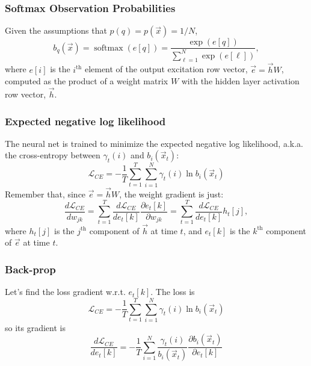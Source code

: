 \documentclass{beamer}
\DeclareMathOperator*{\softmax}{softmax}
\begin{document}
\begin{frame}
  \frametitle{Softmax Observation Probabilities}

  Given the assumptions that $p(q)=p(\vec{x})=1/N$, 
  \begin{displaymath}
    b_q(\vec{x}) = \softmax(e[q]) = \frac{\exp(e[q])}{\sum_{\ell=1}^N \exp(e[\ell])},
  \end{displaymath}
  where $e[i]$ is the $i^{\textrm{th}}$ element of the output
  excitation row vector, $\vec{e}=\vec{h}W$, computed as the product of a
  weight matrix $W$ with the hidden layer activation row vector, $\vec{h}$.
\end{frame}

\begin{frame}
  \frametitle{Expected negative log likelihood}

  The neural net is trained to minimize the expected negative log
  likelihood, a.k.a. the cross-entropy between $\gamma_t(i)$ and
  $b_i(\vec{x}_t)$:
  \begin{displaymath}
    {\mathcal L}_{CE} = -\frac{1}{T}\sum_{t=1}^T\sum_{i=1}^N\gamma_t(i)\ln b_i(\vec{x}_t)
  \end{displaymath}
  Remember that, since $\vec{e}=\vec{h}W$, the weight gradient is just:
  \begin{displaymath}
    \frac{d{\mathcal L}_{CE}}{dw_{jk}} =
    \sum_{t=1}^T \frac{d{\mathcal L}_{CE}}{de_t[k]}\frac{\partial e_t[k]}{\partial w_{jk}}
    = \sum_{t=1}^T\frac{d{\mathcal L}_{CE}}{de_t[k]}h_t[j],
  \end{displaymath}
  where $h_t[j]$ is the $j^{\textrm{th}}$ component of $\vec{h}$ at time $t$, and
  $e_t[k]$ is the $k^{\textrm{th}}$ component of $\vec{e}$ at time $t$.
\end{frame}

\begin{frame}
  \frametitle{Back-prop}

  Let's find the loss gradient w.r.t. $e_t[k]$.
  The loss is
  \begin{displaymath}
    {\mathcal L}_{CE} = -\frac{1}{T}\sum_{t=1}^T\sum_{i=1}^N\gamma_t(i)\ln b_i(\vec{x}_t)
  \end{displaymath}
  so its gradient is
  \begin{displaymath}
    \frac{d{\mathcal L}_{CE}}{de_t[k]} = -\frac{1}{T}\sum_{i=1}^N\frac{\gamma_t(i)}{b_i(\vec{x}_t)}\frac{\partial b_i(\vec{x}_t)}{\partial e_t[k]}
  \end{displaymath}
\end{frame}
\end{document}
